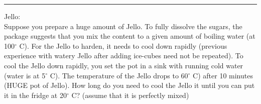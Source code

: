 \begin{center}
\noindent\rule{4cm}{0.4pt}
\end{center}


\begin{exmp}{Jello:}\\
Suppose you prepare a huge amount of Jello. To fully dissolve the sugars, the package suggests that you mix the content to a given amount of boiling water (at 100$^\circ$ C). For the Jello to harden, it needs to cool down rapidly (previous experience with watery Jello after adding ice-cubes need not be repeated). To cool the Jello down rapidly, you set the pot in a sink with running cold water (water is at 5$^\circ$ C). The temperature of the Jello drops to 60$^\circ$ C) after 10 minutes (HUGE pot of Jello). How long do you need to cool the Jello it until you can put it in the fridge at 20$^\circ$ C? (assume that it is perfectly mixed)\\


\end{exmp}
